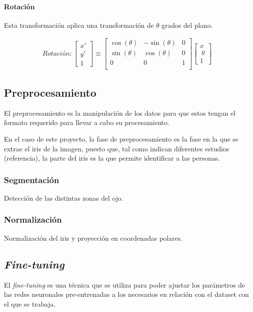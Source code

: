 \paragraph{Rotación}

Esta transformación aplica una transformación de $\theta$ grados del plano.

\label{img:transformacion-rotacion}


\begin{gather}
	Rotación:
	\begin{bmatrix} x' \\ y' \\ 1 \end{bmatrix}
	\equiv
	 \begin{bmatrix}
	  \cos(\theta) &-\sin(\theta) & 0 \\
	  \sin(\theta) & \cos(\theta) & 0 \\
	  0 & 0 & 1 \\
	  \end{bmatrix}
	  \begin{bmatrix} x \\\ y \\ 1 \end{bmatrix}
\end{gather}


\subsection{Preprocesamiento}

El preprocesamiento es la manipulación de los datos para que estos tengan el formato requerido para llevar a cabo su procesamiento.

En el caso de este proyecto, la fase de preprocesamiento es la fase en la que se extrae el iris de la imagen, puesto que, tal como indican diferentes estudios (referencia), la parte del iris es la que 
permite identificar a las personas.

\subsubsection{Segmentación}

Detección de las distintas zonas del ojo.

\subsubsection{Normalización}

Normalización del iris y proyección en coordenadas polares.

\subsection{\textit{Fine-tuning}}
   El \textit{fine-tuning} es una técnica que se utiliza para poder ajustar los parámetros de las redes neuronales pre-entrenadas a los necesarios en relación con
   el dataset con el que se trabaja.
